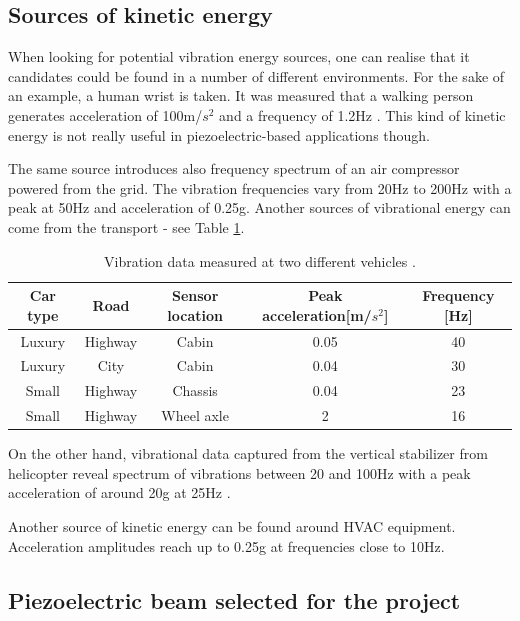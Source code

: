 \documentclass[12pt,a4paper]{article}
\begin{document}
\subsection{Sources of kinetic energy}

When looking for potential vibration energy sources, one can realise that it candidates could be found in a number of different environments. For the sake of an example, a human wrist is taken. It was measured that a walking person generates acceleration of 100m/$s^2$ and a frequency of 1.2Hz \cite{EnHv1}. This kind of kinetic energy is not really useful in piezoelectric-based applications though.
\par
The same source \cite{EnHv1} introduces also frequency spectrum of an air compressor powered from the grid. The vibration frequencies vary from 20Hz to 200Hz with a peak at 50Hz and acceleration of 0.25g.
Another sources of vibrational energy can come from the transport - see Table \ref{tab:vibrations}.

\begin{table}[ht!]
\begin{tabular}{|c|c|c|c|c|}
\hline
\textbf{Car type} & \textbf{Road} & \textbf{Sensor location} & \textbf{Peak acceleration}[m/$s^2$] & \textbf{Frequency} [Hz] \\ \hline
Luxury & Highway & Cabin & 0.05 & 40 \\ \hline
Luxury & City & Cabin & 0.04 & 30 \\ \hline
Small & Highway & Chassis & 0.04 & 23 \\ \hline
Small & Highway & Wheel axle & 2 & 16 \\ \hline
\end{tabular}
\caption{Vibration data measured at two different vehicles \cite{EnHv1}.}
\label{tab:vibrations}
\end{table}

On the other hand, vibrational data captured from the vertical stabilizer from helicopter reveal spectrum of vibrations between 20 and 100Hz with a peak acceleration of around 20g at 25Hz \cite{EnHv1}.
\par
Another source of kinetic energy can be found around HVAC equipment. Acceleration amplitudes reach up to 0.25g at frequencies close to 10Hz.

\subsection{Piezoelectric beam selected for the project}
\end{document}
